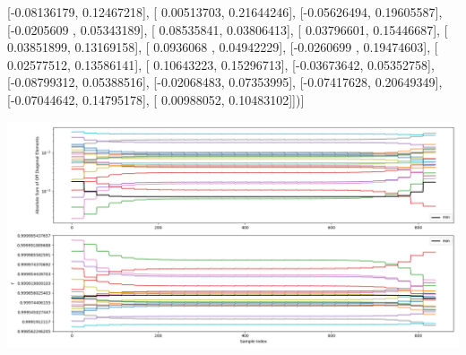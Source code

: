 \documentclass{article}
\begin{document}
       [-0.08136179,  0.12467218],
       [ 0.00513703,  0.21644246],
       [-0.05626494,  0.19605587],
       [-0.0205609 ,  0.05343189],
       [ 0.08535841,  0.03806413],
       [ 0.03796601,  0.15446687],
       [ 0.03851899,  0.13169158],
       [ 0.0936068 ,  0.04942229],
       [-0.0260699 ,  0.19474603],
       [ 0.02577512,  0.13586141],
       [ 0.10643223,  0.15296713],
       [-0.03673642,  0.05352758],
       [-0.08799312,  0.05388516],
       [-0.02068483,  0.07353995],
       [-0.07417628,  0.20649349],
       [-0.07044642,  0.14795178],
       [ 0.00988052,  0.10483102]])]
\begin{center}
\includegraphics[scale=.9]{report_pickled_controls158/control_dpn_all.png}

\end{center}
\end{document}
